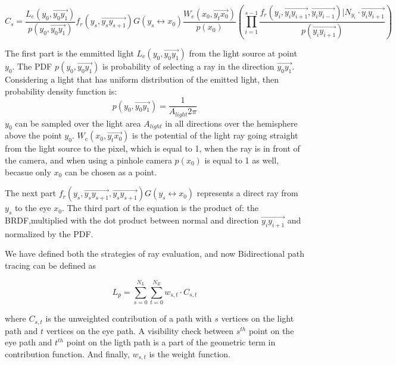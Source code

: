 \documentclass[11pt, a4paper]{article}
\begin{document}
\begin{equation}\label{eq:lighttracing}
    C_s = \frac{L_e(y_0,\overrightarrow{y_0y_1})}{p(y_0,\overrightarrow{y_0y_1})}f_r(y_s,\overrightarrow{y_sy_{s+1}})G(y_s \leftrightarrow x_0) \frac{W_e(x_0,\overrightarrow{y_tx_0})}{p(x_0)} \left( \prod_{i=1}^{s-1}\frac{f_r(y_i,\overrightarrow{y_iy_{i+1}},\overrightarrow{y_iy_{i-1}})|N_{y_i} \cdot \overrightarrow{y_iy_{i+1}}}{p(\overrightarrow{y_iy_{i+1}})}\right)
\end{equation}

The first part is the emmitted light $L_e(y_0,\overrightarrow{y_0y_1})$ from the light source at point $y_0$. The PDF $p(y_0,\overrightarrow{y_0y_1})$ is probability of selecting a ray in the direction $\overrightarrow{y_0y_1}$. Considering a light that has uniform distribution of the emitted light, then probability density function is:
\begin{equation}
    p(y_0,\overrightarrow{y_0y_1}) = \frac{1}{A_{light}2\pi}
\end{equation}
$y_0$ can be sampled over the light area $A_{light}$ in all directions over the hemisphere above the point $y_0$. $W_e(x_0,\overrightarrow{y_tx_0})$ is the potential of the light ray going straight from the light source to the pixel, which is equal to 1, when the ray is in front of the camera, and when using a pinhole camera $p(x_0)$ is equal to 1 as well, becasue only $x_0$ can be chosen as a point.

The next part $f_r(y_s,\overrightarrow{y_sy_{s+1}},\overrightarrow{y_sy_{s+1}}) G(y_s \leftrightarrow x_0)$ represents a direct ray from $y_s$ to the eye $x_0$. The third part  of the equation is the product of: the BRDF,multiplied with the dot product between normal and direction $\overrightarrow{y_iy_{i+1}}$ and normalized by the PDF.

We have defined both the strategies of ray evaluation, and now Bidirectional path tracing can be defined as 

\begin{equation}
    L_p = \sum_{s=0}^{N_L}\sum_{t=0}^{N_E} w_{s,t} \cdot C_{s,t}
\end{equation}

where $C_{s,t}$ is the unweighted contribution of a path with $s$ vertices on the light path and $t$ vertices on the eye path. A visibility check between $s^{th}$ point on the eye path and $t^{th}$ point on the ligth path is a part of the geometric term in contribution function. And finally, $w_{s,t}$ is the weight function.
\end{document}
